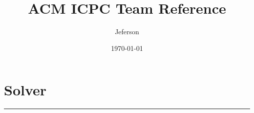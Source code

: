 \documentclass[landscape,twocolumn,a4paper]{article}
\author{Jeferson}
\title{ACM ICPC Team Reference}
\date{\today}
\newcommand{\Csourcefile}[1]{}
\newcommand{\CODE}[2]{\section*{#1} \Csourcefile{#2} \rule{14cm}{0.25pt} \newpage }
\begin{document}
\scriptsize{}
\maketitle{}
\thispagestyle{fancy}

\CODE{Solver} {solver}
\end{document}
